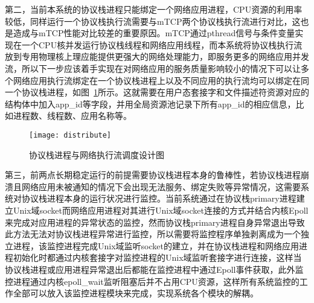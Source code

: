 第二，当前本系统的协议栈进程只能绑定一个网络应用进程，CPU资源的利用率较低，同样运行一个协议栈执行流需要与mTCP两个协议栈执行流进行对比，这也是造成与mTCP性能对比较差的重要原因。mTCP通过pthread信号与条件变量实现在一个CPU核并发运行协议栈线程和网络应用线程，而本系统将协议栈执行流放到专用物理核上理应能提供更强大的网络处理能力，即服务更多的网络应用并发流，所以下一步应该着手实现在对网络应用的服务质量影响较小的情况下可以让多个网络应用执行流绑定在一个协议栈进程上以及不同应用的执行流均可以绑定在同一个协议栈进程，如图~\ref{fig:distribute}所示。这就需要在用户态套接字和文件描述符资源对应的结构体中加入app\_id等字段，并用全局资源池记录下所有app\_id的相应信息，比如进程数、线程数、应用名称等。

\vspace{-10pt}
\begin{figure}[H] %
  \centering
  \texttt{[image: distribute]}
  \caption{协议栈进程与网络执行流调度设计图}
  \label{fig:distribute}
\end{figure}
\vspace{-10pt}

第三，前两点长期稳定运行的前提需要协议栈进程本身的鲁棒性，若协议栈进程崩溃且网络应用未被通知的情况下会出现无法服务、绑定失败等异常情况，这需要系统对协议栈进程本身的运行状况进行监控。当前系统通过在协议栈primary进程建立Unix域socket而网络应用进程对其进行Unix域socket连接的方式并结合内核Epoll来完成对应用进程的异常状态的监控，然而协议栈primary进程自身异常退出导致此方法无法对协议栈进程异常进行监控，所以需要将监控程序单独剥离成为一个独立进程，该监控进程完成Unix域监听socket的建立，并在协议栈进程和网络应用进程初始化时都通过内核套接字对监控进程的Unix域监听套接字进行连接，这样当协议栈进程或应用进程异常退出后都能在监控进程中通过Epoll事件获取，此外监控进程通过内核epoll\_wait监听阻塞后并不占用CPU资源，这样所有系统监控的工作全部可以放入该监控进程模块来完成，实现系统各个模块的解耦。

